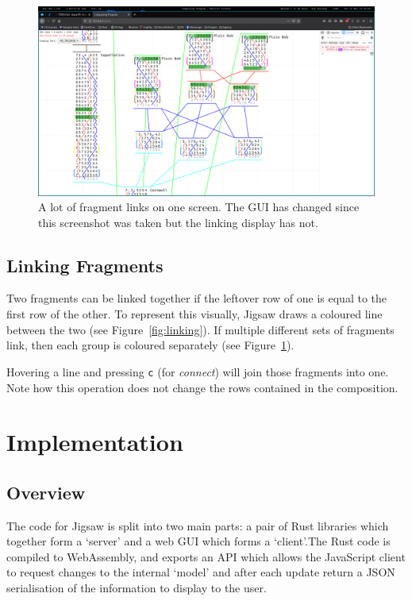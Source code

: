 \documentclass[12pt]{article}
\begin{document}
\begin{figure}[h!]
    \centering
    \includegraphics[width=\textwidth]{linking-insane}
    \caption{A lot of fragment links on one screen.  The GUI has changed since this screenshot
    was taken but the linking display has not.}\label{fig:linking-insane}
\end{figure}

\subsection{Linking Fragments}

Two fragments can be linked together if the leftover row of one is equal to the first row of the
other.  To represent this visually, Jigsaw draws a coloured line between the two (see
Figure~\ref{fig:linking}).  If multiple different sets of fragments link, then each group is
coloured separately (see Figure~\ref{fig:linking-insane}).

Hovering a line and pressing \verb|c| (for \emph{connect}) will join those fragments into one.  Note how
this operation does not change the rows contained in the composition.



\pagebreak

\section{Implementation}

\subsection{Overview}

The code for Jigsaw is split into two main parts: a pair of Rust libraries which together form a `server'
and a web GUI which forms a `client'.\@  The Rust code is compiled to WebAssembly, and exports an
API which allows the JavaScript client to request changes to the internal `model' and after each
update return a
JSON serialisation of the information to display to the user.
\end{document}
